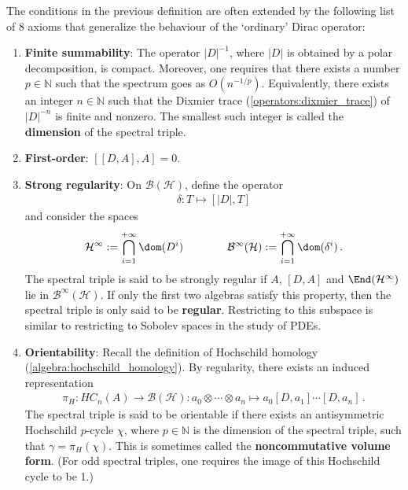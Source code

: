     \begin{remark}
        The conditions in the previous definition are often extended by the following list of 8 axioms that generalize the behaviour of the `ordinary' Dirac operator:
        \begin{enumerate}
            \item\textbf{Finite summability}: The operator $|D|^{-1}$, where $|D|$ is obtained by a polar decomposition, is compact. Moreover, one requires that there exists a number $p\in\mathbb{N}$ such that the spectrum goes as $O(n^{-1/p})$. Equivalently, there exists an integer $n\in\mathbb{N}$ such that the Dixmier trace (\cref{operators:dixmier_trace}) of $|D|^{-n}$ is finite and nonzero. The smallest such integer is called the \textbf{dimension} of the spectral triple.
            \item\textbf{First-order}: $[[D,A],A]=0$.
            \item\textbf{Strong regularity}: On $\mathcal{B}(\mathcal{H})$, define the operator
            \begin{gather}
                \delta:T\mapsto[|D|,T]
            \end{gather}
            and consider the spaces
            \begin{gather}
                \mathcal{H}^\infty:=\bigcap_{i=1}^{+\infty}\dom(D^i)\qquad\qquad\mathcal{B}^\infty(\mathcal{H}):=\bigcap_{i=1}^{+\infty}\dom(\delta^i)\,.
            \end{gather}
            The spectral triple is said to be strongly regular if $A$, $[D,A]$ and $\End(\mathcal{H}^\infty)$ lie in $\mathcal{B}^\infty(\mathcal{H})$. If only the first two algebras satisfy this property, then the spectral triple is only said to be \textbf{regular}. Restricting to this subspace is similar to restricting to Sobolev spaces in the study of PDEs.
            \item\textbf{Orientability}: Recall the definition of Hochschild homology (\cref{algebra:hochschild_homology}). By regularity, there exists an induced representation
            \begin{gather}
                \pi_H:HC_n(A)\rightarrow\mathcal{B}(\mathcal{H}):a_0\otimes\cdots\otimes a_n\mapsto a_0[D,a_1]\cdots[D,a_n]\,.
            \end{gather}
            The spectral triple is said to be orientable if there exists an antisymmetric Hochschild $p$-cycle $\chi$, where $p\in\mathbb{N}$ is the dimension of the spectral triple, such that $\gamma=\pi_H(\chi)$. This is sometimes called the \textbf{noncommutative volume form}. (For odd spectral triples, one requires the image of this Hochschild cycle to be 1.)

\end{enumerate}
\end{remark}
